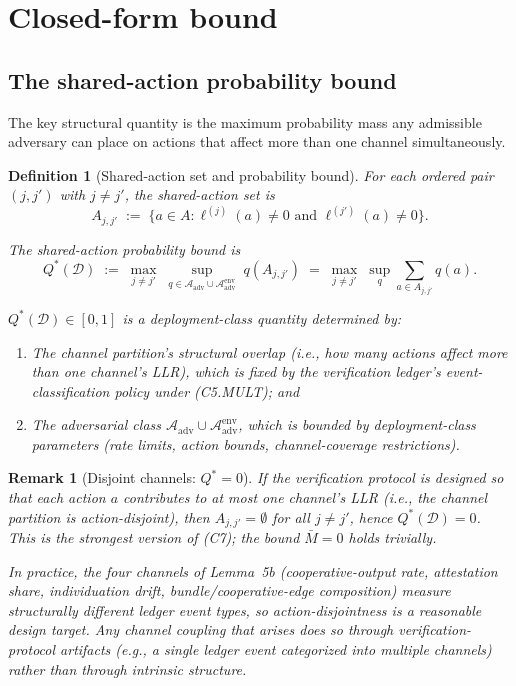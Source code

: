 \documentclass{article}
\newtheorem{definition}{Definition}
\newtheorem{remark}{Remark}
\newcommand{\Aadv}{\mathcal{A}_{\mathrm{adv}}}
\begin{document}
\section{Closed-form bound}

\subsection{The shared-action probability bound}

The key structural quantity is the maximum probability mass any
admissible adversary can place on actions that affect more than
one channel simultaneously.

\begin{definition}[Shared-action set and probability bound]
\label{def:Q-star}
For each ordered pair $(j, j')$ with $j \neq j'$, the
\emph{shared-action set} is
\begin{equation}
  A_{j, j'} \;:=\; \{ a \in A : \ell^{(j)}(a) \neq 0 \text{ and }
  \ell^{(j')}(a) \neq 0 \}.
\end{equation}

The \emph{shared-action probability bound} is
\begin{equation}
\label{eq:Q-star}
  Q^*(\mathcal{D})
  \;:=\; \max_{j \neq j'}\;
  \sup_{q \in \Aadv \cup \Aadv^{\mathrm{env}}}\;
  q(A_{j, j'})
  \;=\; \max_{j \neq j'}\; \sup_q \sum_{a \in A_{j, j'}} q(a).
\end{equation}

$Q^*(\mathcal{D}) \in [0, 1]$ is a deployment-class quantity
determined by:
\begin{enumerate}
\item The channel partition's structural overlap (i.e., how many
  actions affect more than one channel's LLR), which is fixed by
  the verification ledger's event-classification policy under
  (C5.MULT); and
\item The adversarial class $\Aadv \cup \Aadv^{\mathrm{env}}$,
  which is bounded by deployment-class parameters (rate limits,
  action bounds, channel-coverage restrictions).
\end{enumerate}
\end{definition}

\begin{remark}[Disjoint channels: $Q^* = 0$]
\label{rem:disjoint}
If the verification protocol is designed so that each action $a$
contributes to at most one channel's LLR (i.e., the channel
partition is \emph{action-disjoint}), then $A_{j, j'} = \emptyset$
for all $j \neq j'$, hence $Q^*(\mathcal{D}) = 0$.  This is the
strongest version of (C7); the bound $\bar{M} = 0$ holds trivially.

In practice, the four channels of Lemma~5b
(cooperative-output rate, attestation share, individuation drift,
bundle/cooperative-edge composition) measure structurally
different ledger event types, so action-disjointness is a
reasonable design target.  Any channel coupling that arises does
so through verification-protocol artifacts (e.g., a single ledger
event categorized into multiple channels) rather than through
intrinsic structure.
\end{remark}
\end{document}
